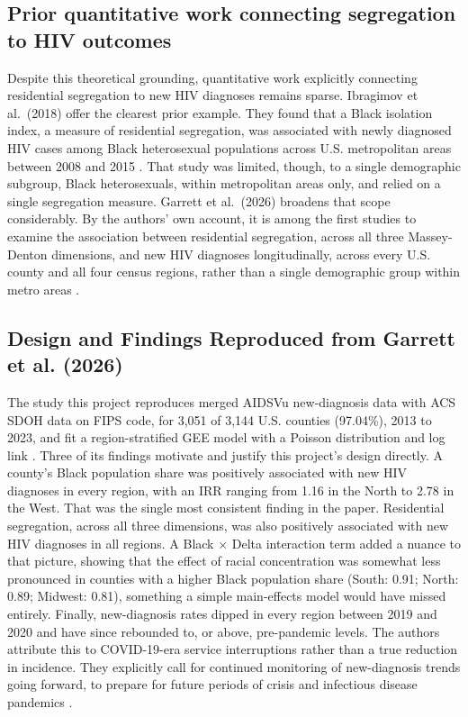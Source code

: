 \documentclass[11pt,letterpaper]{article}
\begin{document}
\subsection{Prior quantitative work connecting segregation to HIV outcomes}
Despite this theoretical grounding, quantitative work explicitly connecting residential segregation to new HIV diagnoses remains sparse. Ibragimov et al.\ (2018) offer the clearest prior example. They found that a Black isolation index, a measure of residential segregation, was associated with newly diagnosed HIV cases among Black heterosexual populations across U.S. metropolitan areas between 2008 and 2015 \cite{ibragimov2018}. That study was limited, though, to a single demographic subgroup, Black heterosexuals, within metropolitan areas only, and relied on a single segregation measure. Garrett et al.\ (2026) broadens that scope considerably. By the authors' own account, it is among the first studies to examine the association between residential segregation, across all three Massey-Denton dimensions, and new HIV diagnoses longitudinally, across every U.S. county and all four census regions, rather than a single demographic group within metro areas \cite{garrett2026}.

\subsection{Design and Findings Reproduced from Garrett et al. (2026)}
The study this project reproduces merged AIDSVu new-diagnosis data with ACS SDOH data on FIPS code, for 3,051 of 3,144 U.S. counties (97.04\%), 2013 to 2023, and fit a region-stratified GEE model with a Poisson distribution and log link \cite{garrett2026}. Three of its findings motivate and justify this project's design directly. A county's Black population share was positively associated with new HIV diagnoses in every region, with an IRR ranging from 1.16 in the North to 2.78 in the West. That was the single most consistent finding in the paper. Residential segregation, across all three dimensions, was also positively associated with new HIV diagnoses in all regions. A Black $\times$ Delta interaction term added a nuance to that picture, showing that the effect of racial concentration was somewhat less pronounced in counties with a higher Black population share (South: 0.91; North: 0.89; Midwest: 0.81), something a simple main-effects model would have missed entirely. Finally, new-diagnosis rates dipped in every region between 2019 and 2020 and have since rebounded to, or above, pre-pandemic levels. The authors attribute this to COVID-19-era service interruptions rather than a true reduction in incidence. They explicitly call for continued monitoring of new-diagnosis trends going forward, to prepare for future periods of crisis and infectious disease pandemics \cite{garrett2026}.
\end{document}
